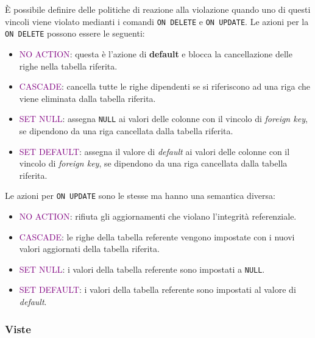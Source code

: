 È possibile definire delle politiche di reazione alla violazione quando uno di questi vincoli viene violato medianti i comandi \verb|ON DELETE| e
\verb|ON UPDATE|. Le azioni per la \verb|ON DELETE| possono essere le seguenti:
\begin{itemize}
    \item \textcolor{purple}{NO ACTION}: questa è l'azione di \textbf{default} e blocca la cancellazione
        delle righe nella tabella riferita.
    \item \textcolor{purple}{CASCADE}: cancella tutte le righe dipendenti se si riferiscono ad una riga che viene
        eliminata dalla tabella riferita.
    \item \textcolor{purple}{SET NULL}: assegna \verb|NULL| ai valori delle colonne con il vincolo di \emph{foreign key},
        se dipendono da una riga cancellata dalla tabella riferita.
    \item \textcolor{purple}{SET DEFAULT}: assegna il valore di \emph{default} ai valori delle colonne con il vincolo di \emph{foreign key},
        se dipendono da una riga cancellata dalla tabella riferita.
\end{itemize}

Le azioni per \verb|ON UPDATE| sono le stesse ma hanno una semantica diversa:
\begin{itemize}
    \item \textcolor{purple}{NO ACTION}: rifiuta gli aggiornamenti che violano l'integrità referenziale.
    \item \textcolor{purple}{CASCADE}: le righe della tabella referente vengono impostate con i nuovi valori aggiornati della tabella riferita.
    \item \textcolor{purple}{SET NULL}: i valori della tabella referente sono impostati a \verb|NULL|.
    \item \textcolor{purple}{SET DEFAULT}: i valori della tabella referente sono impostati al valore di \emph{default}.
\end{itemize}

\subsubsection{Viste}